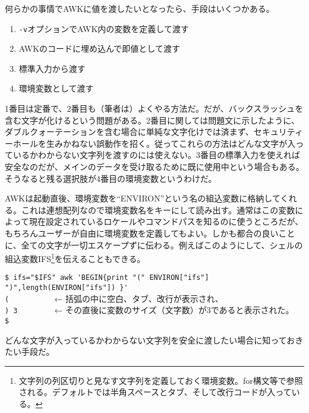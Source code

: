 何らかの事情でAWKに値を渡したいとなったら、手段はいくつかある。
\begin{enumerate}
  \item \verb|-v|オプションでAWK内の変数を定義して渡す
  \item AWKのコードに埋め込んで即値として渡す
  \item 標準入力から渡す
  \item 環境変数として渡す
\end{enumerate}
1番目は定番で、2番目も（筆者は）よくやる方法だ。だが、バックスラッシュを含む文字が化けるという問題がある。2番目に関しては問題文に示したように、ダブルクォーテーションを含む場合に単純な文字化けでは済まず、セキュリティーホールを生みかねない誤動作を招く。従ってこれらの方法はどんな文字が入っているかわからない文字列を渡すのには使えない。3番目の標準入力を使えれば安全なのだが、メインのデータを受け取るために既に使用中という場合もある。そうなると残る選択肢が4番目の環境変数というわけだ。

AWKは起動直後、環境変数を``ENVIRON''という名の組込変数に格納してくれる。これは連想配列なので環境変数名をキーにして読み出す。通常はこの変数によって現在設定されているロケールやコマンドパスを知るのに使うところだが、もちろんユーザーが自由に環境変数を定義してもよい。しかも都合の良いことに、全ての文字が一切エスケープずに伝わる。例えばこのようにして、シェルの組込変数IFS\footnote{文字列の列区切りと見なす文字列を定義しておく環境変数。for構文等で参照される。デフォルトでは半角スペースとタブ、そして改行コードが入っている。}を伝えることもできる。
\begin{screen}
	\verb!$ ifs="$IFS" awk 'BEGIN{print "(" ENVIRON["ifs"] ")",length(ENVIRON["ifs"]) }'! \return \\
	\verb!(          ! ← 括弧の中に空白、タブ、改行が表示され、 \\
	\verb!) 3        ! ← その直後に変数のサイズ（文字数）が3であると表示された。 \\
	\verb!$ !
\end{screen}

どんな文字が入っているかわからない文字列を安全に渡したい場合に知っておきたい手段だ。